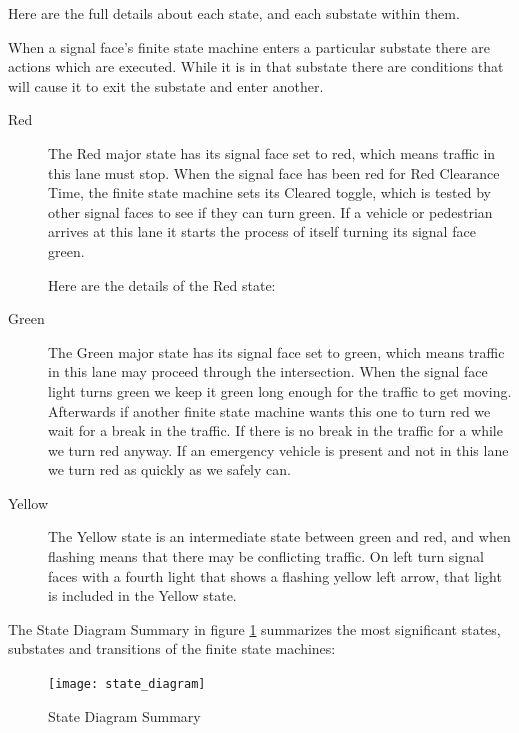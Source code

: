 \documentclass[letterpaper,twoside]{article}
\begin{document}
Here are the full details about each state, and each substate within them.

When a signal face's finite state machine enters a particular substate
there are actions which are executed.
While it is in that substate there are conditions
that will cause it to exit the substate and enter another.

\begin{description}

\item[Red]
  The Red major state has its signal face set to red,
  which means traffic in this
  lane must stop.  When the signal face has been red for Red Clearance Time,
  the finite state machine sets its Cleared toggle, which is tested by other
  signal faces to see if they can turn green.  If a vehicle or
  pedestrian arrives at this lane it starts the process
  of itself turning its signal face green.

  Here are the details of the Red state:
      
  
  
\item[Green]
  The Green major state has its signal face set to green,
  which means traffic in this lane
  may proceed through the intersection.
  When the signal face light turns green
  we keep it green long enough
  for the traffic to get moving.  Afterwards if another finite state machine
  wants this one to turn red we wait for a break in the traffic.
  If there is no break in the
  traffic for a while we turn red anyway.
  If an emergency vehicle is present and not in this lane
  we turn red as quickly as we safely can.

  

\item[Yellow]
  The Yellow state is an intermediate state between green and red, and when
  flashing means that there may be conflicting traffic.  On left turn signal
  faces with a fourth light that shows a flashing yellow left arrow, that
  light is included in the Yellow state.

  
  
\end{description}

The State Diagram Summary in figure \ref{fig:State_Diagram_Summary}
summarizes the most significant states, substates and
transitions of the finite state machines:

\begin{figure}[htb]
  {\texttt{[image: state\_diagram]}}
  {\caption{State Diagram Summary}\label{fig:State_Diagram_Summary}}
\end{figure}
\end{document}
